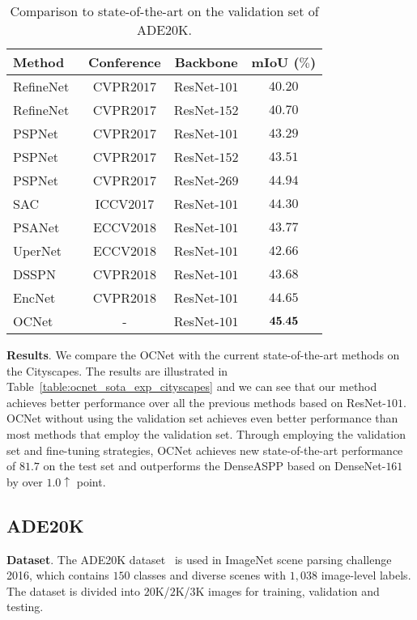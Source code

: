 \documentclass[10pt,twocolumn,letterpaper]{article}
\begin{document}
\begin{table}[htb]
\centering
\footnotesize
\caption{\small{Comparison to state-of-the-art on the validation set of ADE20K.}}
\begin{tabular}{l|c|c|c} \hline
Method & Conference & Backbone & mIoU ($\%$)  \\
\hline
RefineNet~\cite{lin2017refinenet} &  CVPR$2017$  & ResNet-$101$  &  $40.20$ \\
RefineNet~\cite{lin2017refinenet} &  CVPR$2017$  & ResNet-$152$  & $40.70$\\
PSPNet~\cite{zhao2017pyramid}  &  CVPR$2017$  & ResNet-$101$  &  $43.29$ \\
PSPNet~\cite{zhao2017pyramid}  &  CVPR$2017$  & ResNet-$152$  &  $43.51$ \\
PSPNet~\cite{zhao2017pyramid}  &  CVPR$2017$  & ResNet-$269$  &  \underline{$44.94$} \\
SAC~\cite{Zhang_2017_ICCV}  &  ICCV$2017$  & ResNet-$101$  &  $44.30$ \\
PSANet~\cite{psanet} &  ECCV$2018$  & ResNet-$101$  &  $43.77$ \\
UperNet~\cite{xiao2018unified} &  ECCV$2018$  & ResNet-$101$  &  $42.66$ \\
DSSPN~\cite{Liang_2018_CVPR}  &  CVPR$2018$  & ResNet-$101$  &  $43.68$ \\
EncNet~\cite{Zhang_2018_CVPR}  &  CVPR$2018$  & ResNet-$101$  &  $44.65$ \\
OCNet & - &  ResNet-$101$ & $\bf{45.45}$ \\
\hline
\end{tabular}
\label{table:ocnet_sota_exp_ade20k}
\end{table}

\vspace{0.1cm}
\noindent\textbf{Results}.
We compare the OCNet with the current state-of-the-art methods on the Cityscapes.
The results are illustrated in Table~\ref{table:ocnet_sota_exp_cityscapes} and we can see that our method achieves better performance over all the previous methods based on ResNet-$101$.
OCNet without using the validation set achieves even better performance than most methods that employ the validation set.
Through employing the validation set and fine-tuning strategies,
OCNet achieves new state-of-the-art performance of $81.7$ on the test set and outperforms
the DenseASPP based on DenseNet-$161$ by over $1.0 \uparrow $ point.

\subsection{ADE20K}
\noindent\textbf{Dataset}.
The ADE20K dataset~\cite{zhou2017scene} is used in ImageNet scene parsing challenge 2016, which contains $150$ classes and diverse scenes with $1,038$ image-level labels.
The dataset is divided into $20$K/$2$K/$3$K images for training, validation and testing.
\end{document}
